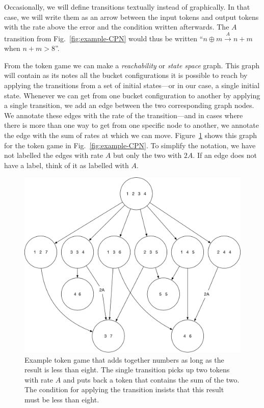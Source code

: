 \documentclass[graybox]{svmult}
\newcommand{\trans}[3]{\ensuremath{#1 \xrightarrow{#2} #3}}
\begin{document}
Occasionally, we will define transitions textually instead of graphically. In that case, we will write them as an arrow between the input tokens and output tokens with the rate above the error and the condition written afterwards. The $A$ transition from Fig.~\ref{fig:example-CPN} would thus be written ``$\trans{n\oplus m}{A}{n+m}$ when $n+m>8$''.

From the token game we can make a \emph{reachability} or \emph{state space} graph. This graph will contain as its notes all the bucket configurations it is possible to reach by applying the transitions from a set of initial states---or in our case, a single initial state. Whenever we can get from one bucket configuration to another by applying a single transition, we add an edge between the two corresponding graph nodes. We annotate these edges with the rate of the transition---and in cases where there is more than one way to get from one specific node to another, we annotate the edge with the sum of rates at which we can move. Figure~\ref{fig:example-state-space-graph} shows this graph for the token game in Fig.~\ref{fig:example-CPN}. To simplify the notation, we have not labelled the edges with rate $A$ but only the two with $2A$. If an edge does not have a label, think of it as labelled with $A$.

\begin{figure}[t]
\sidecaption[t]
\includegraphics[scale=.30]{figures/example-state-space-graph}
\caption{Example token game that adds together numbers as long as the result is less than eight. The single transition picks up two tokens with rate $A$ and puts back a token that contains the sum of the two. The condition for applying the transition insists that this result must be less than eight.}
\label{fig:example-state-space-graph}
\end{figure}
\end{document}
